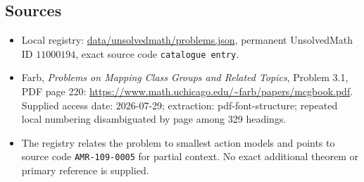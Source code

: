 \documentclass[11pt]{article}
\begin{document}
\subsection{Sources}
\begin{itemize}
\item Local registry: \url{data/unsolvedmath/problems.json}, permanent UnsolvedMath ID $11000194$, exact source code \texttt{catalogue entry}.
\item Farb, \emph{Problems on Mapping Class Groups and Related Topics}, Problem 3.1, PDF page 220: \url{https://www.math.uchicago.edu/~farb/papers/mcgbook.pdf}. Supplied access date: 2026-07-29; extraction: pdf-font-structure; repeated local numbering disambiguated by page among 329 headings.
\item The registry relates the problem to smallest action models and points to source code \texttt{AMR-109-0005} for partial context. No exact additional theorem or primary reference is supplied.
\end{itemize}
\end{document}
